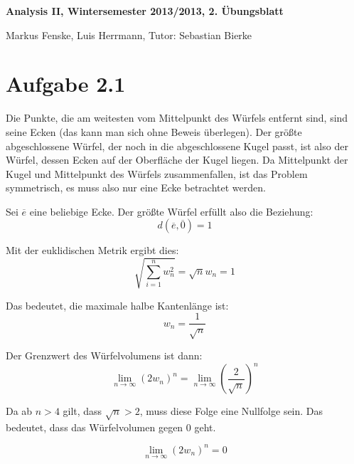 \documentclass[a4paper,german,12pt,smallheadings]{scrartcl}
\begin{document}
\begin{center}
\bfseries %
\sffamily %
\vspace{-40pt}
Analysis II, Wintersemester 2013/2013, 2. Übungsblatt

Markus Fenske, Luis Herrmann, Tutor: Sebastian Bierke
\vspace{-10pt}
\end{center}

\section*{Aufgabe 2.1}
Die Punkte, die am weitesten vom Mittelpunkt des Würfels entfernt sind, sind
seine Ecken (das kann man sich ohne Beweis überlegen). Der größte
abgeschlossene Würfel, der noch in die abgeschlossene Kugel passt, ist also der
Würfel, dessen Ecken auf der Oberfläche der Kugel liegen. Da Mittelpunkt der
Kugel und Mittelpunkt des Würfels zusammenfallen, ist das Problem symmetrisch,
es muss also nur eine Ecke betrachtet werden.

Sei $\overline{e}$ eine beliebige Ecke. Der größte Würfel erfüllt also die Beziehung:
\begin{equation}
  d(\overline{e},\overline{0}) = 1
\end{equation}

Mit der euklidischen Metrik ergibt dies:
\begin{equation*}
  \sqrt{\sum_{i=1}^n w_n^2} = \sqrt{n} w_n = 1
\end{equation*}

Das bedeutet, die maximale halbe Kantenlänge ist:
\begin{equation*}
  w_n = \frac{1}{\sqrt{n}}
\end{equation*}

Der Grenzwert des Würfelvolumens ist dann:
\begin{equation*}
  \lim_{n \to \infty} (2w_n)^n = \lim_{n \to \infty} \left(\frac{2}{\sqrt{n}}\right)^n
\end{equation*}

Da ab $n > 4$ gilt, dass $\sqrt{n} > 2$, muss diese Folge eine
Nullfolge sein. Das bedeutet, dass das Würfelvolumen gegen 0 geht.

\begin{equation*}
  \lim_{n \to \infty} (2w_n)^n = 0
\end{equation*}
\end{document}
